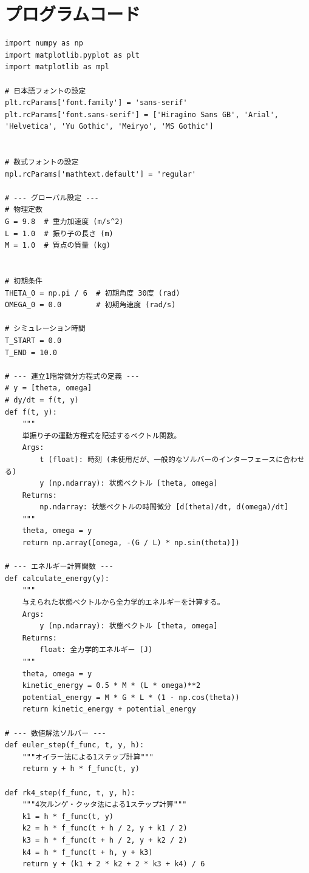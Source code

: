 \documentclass{article}
\begin{document}
\section{プログラムコード}
\begin{lstlisting}[caption={Python code used for numerical experiments, tables, and graphs in this study}, label={lst:code}]
import numpy as np
import matplotlib.pyplot as plt
import matplotlib as mpl

# 日本語フォントの設定
plt.rcParams['font.family'] = 'sans-serif'
plt.rcParams['font.sans-serif'] = ['Hiragino Sans GB', 'Arial', 'Helvetica', 'Yu Gothic', 'Meiryo', 'MS Gothic']


# 数式フォントの設定
mpl.rcParams['mathtext.default'] = 'regular'

# --- グローバル設定 ---
# 物理定数
G = 9.8  # 重力加速度 (m/s^2)
L = 1.0  # 振り子の長さ (m)
M = 1.0  # 質点の質量 (kg)


# 初期条件
THETA_0 = np.pi / 6  # 初期角度 30度 (rad)
OMEGA_0 = 0.0        # 初期角速度 (rad/s)

# シミュレーション時間
T_START = 0.0
T_END = 10.0

# --- 連立1階常微分方程式の定義 ---
# y = [theta, omega]
# dy/dt = f(t, y)
def f(t, y):
    """
    単振り子の運動方程式を記述するベクトル関数。
    Args:
        t (float): 時刻 (未使用だが、一般的なソルバーのインターフェースに合わせる)
        y (np.ndarray): 状態ベクトル [theta, omega]
    Returns:
        np.ndarray: 状態ベクトルの時間微分 [d(theta)/dt, d(omega)/dt]
    """
    theta, omega = y
    return np.array([omega, -(G / L) * np.sin(theta)])

# --- エネルギー計算関数 ---
def calculate_energy(y):
    """
    与えられた状態ベクトルから全力学的エネルギーを計算する。
    Args:
        y (np.ndarray): 状態ベクトル [theta, omega]
    Returns:
        float: 全力学的エネルギー (J)
    """
    theta, omega = y
    kinetic_energy = 0.5 * M * (L * omega)**2
    potential_energy = M * G * L * (1 - np.cos(theta))
    return kinetic_energy + potential_energy

# --- 数値解法ソルバー ---
def euler_step(f_func, t, y, h):
    """オイラー法による1ステップ計算"""
    return y + h * f_func(t, y)

def rk4_step(f_func, t, y, h):
    """4次ルンゲ・クッタ法による1ステップ計算"""
    k1 = h * f_func(t, y)
    k2 = h * f_func(t + h / 2, y + k1 / 2)
    k3 = h * f_func(t + h / 2, y + k2 / 2)
    k4 = h * f_func(t + h, y + k3)
    return y + (k1 + 2 * k2 + 2 * k3 + k4) / 6


\end{lstlisting}
\end{document}
